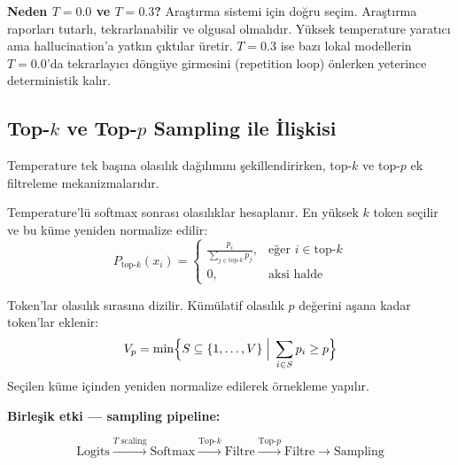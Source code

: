 \textbf{Neden $T{=}0.0$ ve $T{=}0.3$?} Ara\c{s}t{\i}rma sistemi i\c{c}in do\u{g}ru se\c{c}im. Ara\c{s}t{\i}rma raporlar{\i} tutarl{\i}, tekrarlanabilir ve olgusal olmal{\i}d{\i}r. Y\"{u}ksek temperature yarat{\i}c{\i} ama hallucination'a yatk{\i}n \c{c}{\i}kt{\i}lar \"{u}retir. $T{=}0.3$ ise baz{\i} lokal modellerin $T{=}0.0$'da tekrarlay{\i}c{\i} d\"{o}ng\"{u}ye girmesini (repetition loop) \"{o}nlerken yeterince deterministik kal{\i}r.


\subsection{Top-$k$ ve Top-$p$ Sampling ile \.{I}li\c{s}kisi}
\label{sec:sampling}

Temperature tek ba\c{s}{\i}na olas{\i}l{\i}k da\u{g}{\i}l{\i}m{\i}n{\i} \c{s}ekillendirirken, top-$k$ ve top-$p$ ek filtreleme mekanizmalar{\i}d{\i}r.

\begin{formulbox}
Temperature'l\"{u} softmax sonras{\i} olas{\i}l{\i}klar hesaplan{\i}r. En y\"{u}ksek $k$ token se\c{c}ilir ve bu k\"{u}me yeniden normalize edilir:
\begin{equation}
P_{\text{top-}k}(x_i) =
\begin{cases}
\displaystyle\frac{p_i}{\sum_{j \in \text{top-}k} p_j}, & \text{e\u{g}er } i \in \text{top-}k \\[8pt]
0, & \text{aksi halde}
\end{cases}
\label{eq:topk}
\end{equation}
\end{formulbox}

\begin{formulbox}
Token'lar olas{\i}l{\i}k s{\i}ras{\i}na dizilir. K\"{u}m\"{u}latif olas{\i}l{\i}k $p$ de\u{g}erini a\c{s}ana kadar token'lar eklenir:
\begin{equation}
V_p = \min \Bigl\{ S \subseteq \{1,\ldots,V\} \;\Big|\; \sum_{i \in S} p_i \geq p \Bigr\}
\label{eq:topp}
\end{equation}
Se\c{c}ilen k\"{u}me i\c{c}inden yeniden normalize edilerek \"{o}rnekleme yap{\i}l{\i}r.
\end{formulbox}

\textbf{Birle\c{s}ik etki --- sampling pipeline:}

\begin{equation}
\text{Logits} \xrightarrow{T\text{ scaling}} \text{Softmax} \xrightarrow{\text{Top-}k} \text{Filtre} \xrightarrow{\text{Top-}p} \text{Filtre} \xrightarrow{} \text{Sampling}
\label{eq:sampling-pipeline}
\end{equation}

